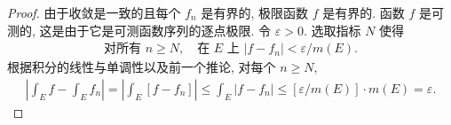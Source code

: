 \documentclass[../../main.tex]{subfiles}
\begin{document}
\begin{proof}
由于收敛是一致的且每个 $f_{n}$ 是有界的, 极限函数 $f$ 是有界的. 函数 $f$ 是可测的, 这是由于它是可测函数序列的逐点极限. 令 $\varepsilon>0$. 选取指标 $N$ 使得
\begin{align}
\text{对所有 }n\geqslant N,\quad\text{在 }E\text{ 上 }|f-f_{n}|<\varepsilon/m(E).\label{align:ch04-一致收敛估计}
\end{align}
根据积分的线性与单调性以及前一个推论, 对每个 $n\geqslant N$,
\begin{align*}
\left|\int_{E}f-\int_{E}f_{n}\right|=\left|\int_{E}[f-f_{n}]\right|\leqslant\int_{E}|f-f_{n}|\leqslant[\varepsilon/m(E)]\cdot m(E)=\varepsilon.
\end{align*}
\end{proof}
\end{document}
